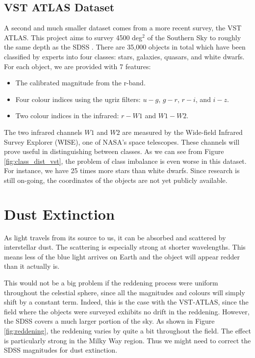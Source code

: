 \subsection{VST ATLAS Dataset} 
A second and much smaller dataset comes from a more recent survey, the VST ATLAS. This project
aims to survey 4500 deg$^2$ of the Southern Sky to roughly the same depth as the SDSS
\cite{shanks15}.
There are 35,000 objects in total which have been classified by experts into four classes:
stars, galaxies, quasars, and white dwarfs. For each object, we are provided
with 7 features:
	\begin{itemize}
		\item The calibrated magnitude from the r-band.
		\item Four colour indices using the ugriz filters: $u-g$, $g-r$, $r-i$, and $i-z$.
		\item Two colour indices in the infrared: $r-W1$ and $W1-W2$.
	\end{itemize}
The two infrared channels $W1$ and $W2$ are measured by the Wide-field Infrared Survey Explorer
(WISE), one of NASA's space telescopes. These channels will prove useful in distinguishing
between classes. As we can see from Figure \ref{fig:class_dist_vst}, the problem of class
imbalance is even worse in this dataset. For instance, we have 25 times more stars than white
dwarfs. Since research is still on-going, the coordinates of the objects are not yet publicly
available.



\section{Dust Extinction} 
As light travels from its source to us, it can be absorbed and scattered by interstellar dust.
The scattering is especially strong at shorter wavelengths.
This means less of the blue light arrives on Earth and the object will appear redder than it actually
is.

This would not be a big problem if the reddening process were uniform throughout the
celestial sphere, since all the magnitudes and colours will simply shift by a constant
term. Indeed, this is the case with the VST-ATLAS, since the field where the objects were
surveyed exhibits no drift in the reddening.
However, the SDSS covers a much larger portion of the sky. As shown in
Figure \ref{fig:reddening}, the reddening varies by quite a bit throughout the field. The
effect is particularly strong in the Milky Way region. Thus we might need to correct the SDSS
magnitudes for dust extinction.

